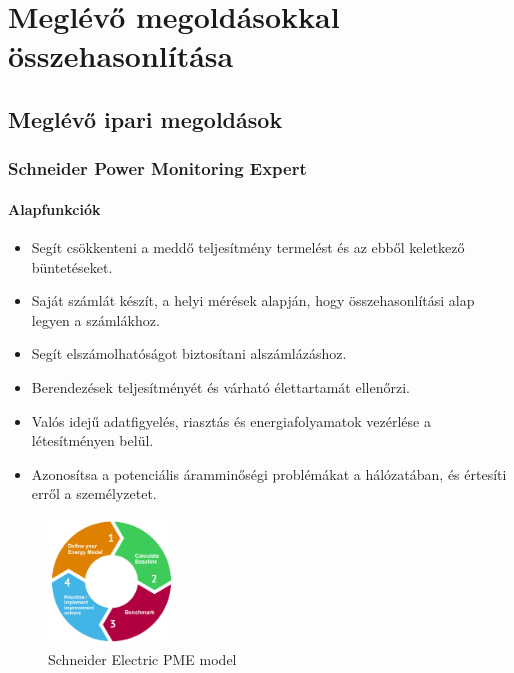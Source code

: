 \chapter{Meglévő megoldásokkal összehasonlítása}

\section{Meglévő ipari megoldások}

\subsection{Schneider Power Monitoring Expert}

\subsubsection{Alapfunkciók}

\begin{itemize}
    \item Segít csökkenteni a meddő teljesítmény termelést és az ebből keletkező büntetéseket.
    \item Saját számlát készít, a helyi mérések alapján, hogy összehasonlítási alap legyen a számlákhoz.
    \item Segít elszámolhatóságot biztosítani alszámlázáshoz.
    \item Berendezések teljesítményét és várható élettartamát ellenőrzi.
    \item Valós idejű adatfigyelés, riasztás és energiafolyamatok vezérlése a létesítményen belül.
    \item Azonosítsa a potenciális áramminőségi problémákat a hálózatában, és értesíti erről a személyzetet.
\end{itemize}
\cite{sePME}

\begin{figure}[ht]
    \centering
    \includegraphics[width=0.3\textwidth]{figures/sePME.png}
    \caption{Schneider Electric PME model\cite{sePME}}
    \label{fig:schneider-pme}
\end{figure}

